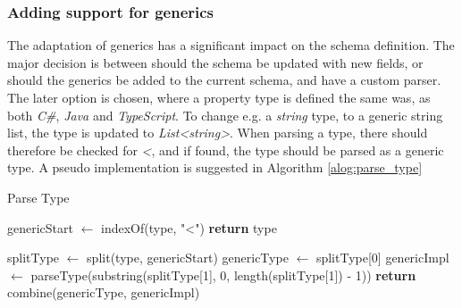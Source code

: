 \subsubsection{Adding support for generics}
The adaptation of generics has a significant impact on the schema definition.
The major decision is between should the schema be updated with new fields, or should the generics be added to the current schema, and have a custom parser.
The later option is chosen, where a property type is defined the same was, as both \textit{C\#}, \textit{Java} and \textit{TypeScript}. To change e.g. a \textit{string} type, to a generic string list, the type is updated to \textit{List\textless string\textgreater}. When parsing a type, there should therefore be checked for \textit{\textless}, and if found, the type should be parsed as a generic type.
A pseudo implementation is suggested in Algorithm \ref{alog:parse_type}
\begin{algorithm}
\caption{Parse Type}
\label{alog:parse_type}
\begin{algorithmic}[1]

    \State genericStart $\gets$ indexOf(type, "\textless")
        \State \textbf{return} type
    \EndIf

    \State splitType $\gets$ split(type, genericStart)
    \State genericType $\gets$ splitType[0]
    \State genericImpl $\gets$ parseType(substring(splitType[1], 0, length(splitType[1]) - 1))
    \State \textbf{return} combine(genericType, genericImpl)
\EndFunction
\end{algorithmic}
\end{algorithm}

